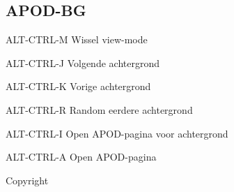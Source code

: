 \documentclass[10pt]{article}
\begin{document}
\begin{multicols}{3}
	\section{APOD-BG}
	\begin{ttdesc}[labelwidth=\widthof{\texttt{WIN-SHIFT+E}}]
	\item[ALT-CTRL-M] Wissel view-mode
	\item[ALT-CTRL-J] Volgende achtergrond
	\item[ALT-CTRL-K] Vorige achtergrond
	\item[ALT-CTRL-R] Random eerdere achtergrond
	\item[ALT-CTRL-I] Open APOD-pagina voor achtergrond
	\item[ALT-CTRL-A] Open APOD-pagina
	\end{ttdesc}



	\noindent Copyright \textcopyright{} \thedate{} \theauthor{}

\end{multicols}
\end{document}
